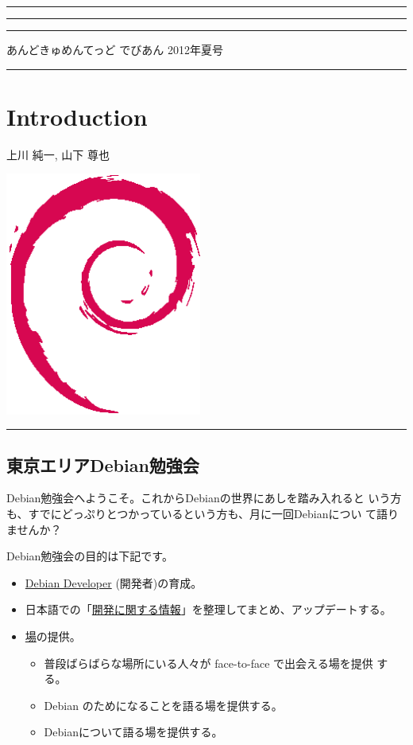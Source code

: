 \documentclass[mingoth,a4paper]{jsarticle}
\renewcommand{\dancersection}[2]{%
\newpage
あんどきゅめんてっど でびあん 2012年夏号
%
\vspace{0.1mm}\\
{\color{dancerdarkblue}\rule{\hsize}{2mm}}

%
%
\begin{minipage}[t]{0.6\hsize}
\color{dancerdarkblue}
\vspace{1cm}
\section{#1}
\hfill{}#2\\
\end{minipage}
\begin{minipage}[t]{0.4\hsize}
\vspace{-2cm}
\hfill{}\includegraphics[height=8cm]{image200502/openlogo-nd.eps}\\
\vspace{-5cm}
\end{minipage}
%
{\color{dancerlightblue}\rule{0.66\hsize}{2mm}}
%
\vspace{2cm}
}
\begin{document}
\setcounter{page}{1}
\begin{minipage}[]{0.2\hsize}
 \colorbox{dancerlightblue}{}
\end{minipage}
\begin{minipage}[]{0.8\hsize}
\hrule
\vspace{1mm}
\hrule
\setcounter{tocdepth}{1}
{\small
\begin{multicols}{2}
  \tableofcontents
\end{multicols}
} %
\vspace{1mm}
\hrule
\vspace{3cm}

\end{minipage}

\dancersection{Introduction}{上川 純一, 山下 尊也}

\subsection{東京エリアDebian勉強会}

 Debian勉強会へようこそ。これからDebianの世界にあしを踏み入れると
 いう方も、すでにどっぷりとつかっているという方も、月に一回Debianについ
 て語りませんか？

 Debian勉強会の目的は下記です。

\begin{itemize}
 \item \underline{Debian Developer} (開発者)の育成。
 \item 日本語での「\underline{開発に関する情報}」を整理してまとめ、アップデートする。
 \item \underline{場}の提供。
 \begin{itemize}
  \item 普段ばらばらな場所にいる人々が face-to-face で出会える場を提供
	する。
  \item Debian のためになることを語る場を提供する。
  \item Debianについて語る場を提供する。
 \end{itemize}
\end{itemize}
\end{document}
